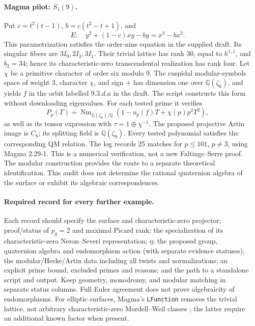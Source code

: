 \documentclass[11pt]{article}
\newcommand{\Q}{\mathbb Q}
\begin{document}
\paragraph{Magma pilot: $S_1(9)$.}
Put $c=t^2(t-1)$, $b=c(t^2-t+1)$, and
\[
 E:\quad y^2+(1-c)xy-by=x^3-bx^2.
\]
This parametrization satisfies the order-nine equation in the supplied draft.
Its singular fibers are $3I_9,2I_3,3I_1$. Their trivial lattice has rank $30$,
equal to $h^{1,1}$, and $b_2=34$; hence its characteristic-zero transcendental
realization has rank four. Let $\chi$ be a primitive character of order six
modulo $9$. The cuspidal modular-symbols space of weight $3$, character $\chi$,
and sign $+$ has dimension one over $\Q(\zeta_6)$, and yields $f$ in the orbit
labelled $9.3.d.a$ in the draft. The script constructs this form without
downloading eigenvalues. For each tested prime it verifies
\[
 P_p(T)=\operatorname{Nm}_{\Q(\zeta_6)/\Q}
       (1-a_p(f)T+\chi(p)p^2T^2),
\]
as well as its tensor expression with $\tau=1\oplus\chi^{-1}$.
The proposed projective Artin image is $C_6$; its splitting field is
$\Q(\zeta_9)$. Every tested polynomial satisfies the corresponding QM relation.
The log records 25 matches for $p\le101$, $p\ne3$, using Magma 2.29-1.
This is a numerical verification, not a new Faltings--Serre proof. The modular
construction provides the route to a separate theoretical identification.
This audit does not determine the rational quaternion algebra of the surface
or exhibit its algebraic correspondences.

\paragraph{Required record for every further example.}
Each record should specify the surface and characteristic-zero projector;
proof/status of $p_g=2$ and maximal Picard rank; the specialization of its
characteristic-zero Neron--Severi representation; $\eta$; the proposed group,
quaternion algebra and endomorphism action (with separate evidence statuses);
the modular/Hecke/Artin data including all twists and normalizations;
an explicit prime bound, excluded primes and reasons; and the path to a
standalone script and output. Keep geometry, monodromy, and modular matching
in separate status columns. Full Euler agreement does not prove algebraicity
of endomorphisms. For elliptic surfaces, Magma's \texttt{LFunction} removes
the trivial lattice, not arbitrary characteristic-zero Mordell--Weil classes
\cite{magma}; the latter require an additional known factor when present.
\end{document}
